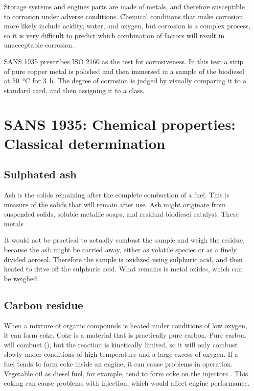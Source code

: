 Storage systems and engines parts are made of metals, and therefore susceptible
to corrosion under adverse conditions. Chemical conditions that make corrosion
more likely include acidity, water, and oxygen, but corrosion is a complex
process, so it is very difficult to predict which combination of factors will
result in unacceptable corrosion.

SANS 1935 prescribes ISO 2160 as the test for corrosiveness. In this test a
strip of pure copper metal is polished and then immersed in a sample of the
biodiesel at \SI{50}{\celsius} for \SI{3}{\hour}. The degree of corrosion is
judged by visually comparing it to a standard card, and then assigning it to a
class.

\section{SANS 1935: Chemical properties: Classical determination}

\subsection{Sulphated ash}

Ash is the solids remaining after the complete combustion of a fuel. This is
measure of the solids that will remain after use. Ash might originate from
suspended solids, soluble metallic soaps, and residual biodiesel catalyst. These
metals

It would not be practical to actually combust the sample and weigh the residue,
because the ash might be carried away, either as volatile species or as a finely
divided aerosol. Therefore the sample is oxidized using sulphuric acid, and then
heated to drive off the sulphuric acid. What remains is metal oxides, which can
be weighed.

\subsection{Carbon residue}

When a mixture of organic compounds is heated under conditions of low oxygen, it
can form coke. Coke is a material that is practically pure carbon. Pure carbon
will combust (), but the reaction is kinetically limited, so it
will only combust slowly under conditions of high temperature and a large excess
of oxygen. If a fuel tends to form coke inside an engine, it can cause problems
in operation. Vegetable oil as diesel fuel, for example, tend to form coke on
the injectors \autocite{Walt1982}. This coking can cause problems with
injection, which would affect engine performance.

